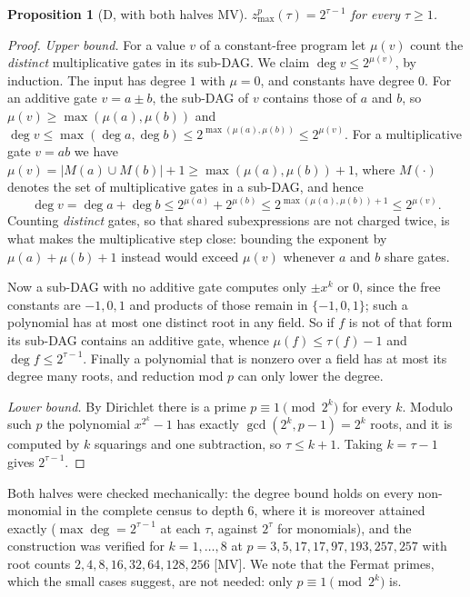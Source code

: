 \documentclass[11pt]{article}
\newtheorem{proposition}[theorem]{Proposition}
\theoremstyle{definition}
\theoremstyle{remark}
\newcommand{\zpmax}{z^{p}_{\max}}
\begin{document}
\begin{proposition}[D, with both halves MV]\label{prop:fp}
$\zpmax(\tau) = 2^{\tau-1}$ for every $\tau \ge 1$.
\end{proposition}
\begin{proof}
\emph{Upper bound.} For a value $v$ of a constant-free program let $\mu(v)$
count the \emph{distinct} multiplicative gates in its sub-DAG. We claim
$\deg v \le 2^{\mu(v)}$, by induction. The input has degree $1$ with
$\mu = 0$, and constants have degree $0$. For an additive gate $v = a \pm b$,
the sub-DAG of $v$ contains those of $a$ and $b$, so
$\mu(v) \ge \max(\mu(a),\mu(b))$ and
$\deg v \le \max(\deg a, \deg b) \le 2^{\max(\mu(a),\mu(b))} \le 2^{\mu(v)}$.
For a multiplicative gate $v = ab$ we have
$\mu(v) = |M(a) \cup M(b)| + 1 \ge \max(\mu(a),\mu(b)) + 1$, where $M(\cdot)$
denotes the set of multiplicative gates in a sub-DAG, and hence
\[
  \deg v = \deg a + \deg b \le 2^{\mu(a)} + 2^{\mu(b)}
  \le 2^{\max(\mu(a),\mu(b))+1} \le 2^{\mu(v)} .
\]
Counting \emph{distinct} gates, so that shared subexpressions are not charged
twice, is what makes the multiplicative step close: bounding the exponent by
$\mu(a)+\mu(b)+1$ instead would exceed $\mu(v)$ whenever $a$ and $b$ share
gates.

Now a sub-DAG with no additive gate computes only $\pm x^k$ or $0$, since the
free constants are $-1,0,1$ and products of those remain in $\{-1,0,1\}$; such
a polynomial has at most one distinct root in any field. So if $f$ is not of
that form its sub-DAG contains an additive gate, whence
$\mu(f) \le \tau(f) - 1$ and $\deg f \le 2^{\tau-1}$. Finally a polynomial
that is nonzero over a field has at most its degree many roots, and reduction
mod $p$ can only lower the degree.

\emph{Lower bound.} By Dirichlet there is a prime $p \equiv 1 \pmod{2^k}$ for
every $k$. Modulo such $p$ the polynomial $x^{2^k} - 1$ has exactly
$\gcd(2^k, p-1) = 2^k$ roots, and it is computed by $k$ squarings and one
subtraction, so $\tau \le k+1$. Taking $k = \tau - 1$ gives $2^{\tau-1}$.
\end{proof}

Both halves were checked mechanically: the degree bound holds on every
non-monomial in the complete census to depth $6$, where it is moreover
attained exactly ($\max \deg = 2^{\tau-1}$ at each $\tau$, against $2^{\tau}$
for monomials), and the
construction was verified for $k = 1,\dots,8$ at
$p = 3, 5, 17, 17, 97, 193, 257, 257$ with root counts
$2, 4, 8, 16, 32, 64, 128, 256$ [MV]. We note that the Fermat primes, which
the small cases suggest, are not needed: only $p \equiv 1 \pmod{2^k}$ is.
\end{document}
